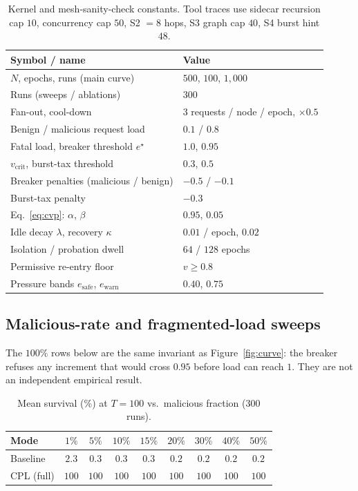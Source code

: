 \documentclass{article}
\begin{document}
\begin{table}[h]
\centering
\caption{Kernel and mesh-sanity-check constants. Tool traces use sidecar recursion cap $10$, concurrency cap $50$, S2 $=8$ hops, S3 graph cap $40$, S4 burst hint $48$.}
\label{tab:const}
{\small
\begin{tabular}{ll}
\toprule
Symbol / name & Value \\
\midrule
$N$, epochs, runs (main curve) & $500$, $100$, $1{,}000$ \\
Runs (sweeps / ablations) & $300$ \\
Fan-out, cool-down & $3$ requests / node / epoch, $\times 0.5$ \\
Benign / malicious request load & $0.1$ / $0.8$ \\
Fatal load, breaker threshold $e^{\star}$ & $1.0$, $0.95$ \\
$v_{\mathrm{crit}}$, burst-tax threshold & $0.3$, $0.5$ \\
Breaker penalties (malicious / benign) & $-0.5$ / $-0.1$ \\
Burst-tax penalty & $-0.3$ \\
Eq.~\eqref{eq:cvp}: $\alpha$, $\beta$ & $0.95$, $0.05$ \\
Idle decay $\lambda$, recovery $\kappa$ & $0.01$ / epoch, $0.02$ \\
Isolation / probation dwell & $64$ / $128$ epochs \\
Permissive re-entry floor & $v \ge 0.8$ \\
Pressure bands $e_{\mathrm{safe}}$, $e_{\mathrm{warn}}$ & $0.40$, $0.75$ \\
\bottomrule
\end{tabular}
}
\end{table}

\subsection{Malicious-rate and fragmented-load sweeps}
\label{app:sweep}

The $100\%$ rows below are the same invariant as Figure~\ref{fig:curve}: the breaker refuses any increment that would cross $0.95$ before load can reach $1$.
They are not an independent empirical result.

\begin{table}[h]
\centering
\caption{Mean survival (\%) at $T=100$ vs.\ malicious fraction (300 runs).}
\label{tab:rate}
{\small
\begin{tabular}{lcccccccc}
\toprule
Mode & $1\%$ & $5\%$ & $10\%$ & $15\%$ & $20\%$ & $30\%$ & $40\%$ & $50\%$ \\
\midrule
Baseline & $2.3$ & $0.3$ & $0.3$ & $0.3$ & $0.2$ & $0.2$ & $0.2$ & $0.2$ \\
CPL (full) & $100$ & $100$ & $100$ & $100$ & $100$ & $100$ & $100$ & $100$ \\
\bottomrule
\end{tabular}
}
\end{table}
\end{document}
